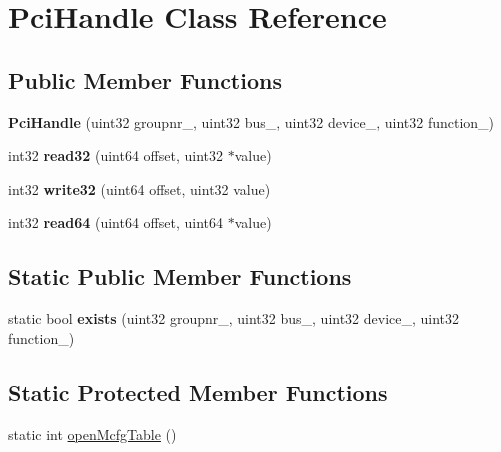 \hypertarget{class_pci_handle}{}\section{Pci\+Handle Class Reference}
\label{class_pci_handle}
\subsection*{Public Member Functions}
\begin{DoxyCompactItemize}
\item 
\mbox{\label{class_pci_handle_a95e2bf928bd4438831c5a3b5b516efe6}} 
{\bfseries Pci\+Handle} (uint32 groupnr\+\_\+, uint32 bus\+\_\+, uint32 device\+\_\+, uint32 function\+\_\+)
\item 
\mbox{\label{class_pci_handle_a76d15c7331d5fddd98d42e8a2316fb7c}} 
int32 {\bfseries read32} (uint64 offset, uint32 $\ast$value)
\item 
\mbox{\label{class_pci_handle_a1975782af9943f65ba1312ff56fb30b1}} 
int32 {\bfseries write32} (uint64 offset, uint32 value)
\item 
\mbox{\label{class_pci_handle_a2f965ad969df3add9c955eaaeb43e715}} 
int32 {\bfseries read64} (uint64 offset, uint64 $\ast$value)
\end{DoxyCompactItemize}
\subsection*{Static Public Member Functions}
\begin{DoxyCompactItemize}
\item 
\mbox{\label{class_pci_handle_ac7eb1a7d50b8e345f75bdc8205592a92}} 
static bool {\bfseries exists} (uint32 groupnr\+\_\+, uint32 bus\+\_\+, uint32 device\+\_\+, uint32 function\+\_\+)
\end{DoxyCompactItemize}
\subsection*{Static Protected Member Functions}
\begin{DoxyCompactItemize}
\item 
static int \mbox{\hyperlink{class_pci_handle_a9b5105f02947177df61ffe78ee81f022}{open\+Mcfg\+Table}} ()
\end{DoxyCompactItemize}
